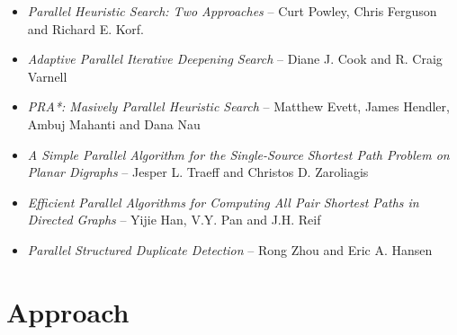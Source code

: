 \documentclass{article}
\begin{document}
\begin{itemize}

\item
\emph{Parallel Heuristic Search: Two Approaches} -- Curt Powley, Chris
Ferguson and Richard E. Korf.

\item
\emph{Adaptive Parallel Iterative Deepening Search} -- Diane J. Cook
and R. Craig Varnell

\item
\emph{PRA*: Masively Parallel Heuristic Search} -- Matthew Evett,
James Hendler, Ambuj Mahanti and Dana Nau

\item
\emph{A Simple Parallel Algorithm for the Single-Source Shortest Path
  Problem on Planar Digraphs} -- Jesper L. Traeff and Christos
D. Zaroliagis

\item
\emph{Efficient Parallel Algorithms for Computing All Pair Shortest
  Paths in Directed Graphs} -- Yijie Han, V.Y. Pan and J.H. Reif

\item
\emph{Parallel Structured Duplicate Detection} -- Rong Zhou and Eric
A. Hansen

\end{itemize}

\section{Approach}
\end{document}
